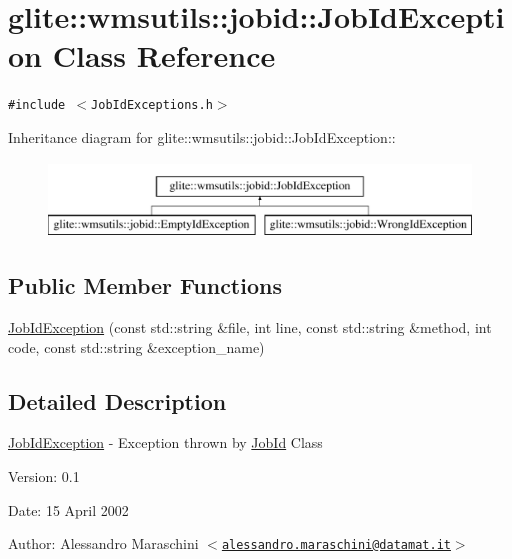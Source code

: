 \hypertarget{classglite_1_1wmsutils_1_1jobid_1_1JobIdException}{
\section{glite::wmsutils::jobid::Job\-Id\-Exception Class Reference}
\label{classglite_1_1wmsutils_1_1jobid_1_1JobIdException}
}
{\tt \#include $<$Job\-Id\-Exceptions.h$>$}

Inheritance diagram for glite::wmsutils::jobid::Job\-Id\-Exception::\begin{figure}[H]
\begin{center}
\leavevmode
\includegraphics[height=2cm]{classglite_1_1wmsutils_1_1jobid_1_1JobIdException}
\end{center}
\end{figure}
\subsection*{Public Member Functions}
\begin{CompactItemize}
\item 
\hyperlink{classglite_1_1wmsutils_1_1jobid_1_1JobIdException_a0}{Job\-Id\-Exception} (const std::string \&file, int line, const std::string \&method, int code, const std::string \&exception\_\-name)
\end{CompactItemize}


\subsection{Detailed Description}
\hyperlink{classglite_1_1wmsutils_1_1jobid_1_1JobIdException}{Job\-Id\-Exception} - Exception thrown by \hyperlink{classglite_1_1wmsutils_1_1jobid_1_1JobId}{Job\-Id} Class \begin{Desc}
\item[Version:]0.1 \end{Desc}
\begin{Desc}
\item[Date:]15 April 2002 \end{Desc}
\begin{Desc}
\item[Author:]Alessandro Maraschini $<$\href{mailto:alessandro.maraschini@datamat.it}{\tt alessandro.maraschini@datamat.it}$>$ \end{Desc}





